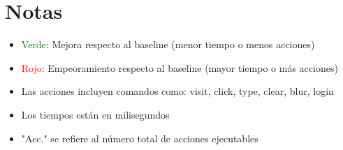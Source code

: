 \documentclass{article}
\begin{document}
\section*{Notas}

\begin{itemize}
\item \textcolor{green}{Verde}: Mejora respecto al baseline (menor tiempo o menos acciones)
\item \textcolor{red}{Rojo}: Empeoramiento respecto al baseline (mayor tiempo o más acciones)
\item Las acciones incluyen comandos como: visit, click, type, clear, blur, login
\item Los tiempos están en milisegundos
\item "Acc." se refiere al número total de acciones ejecutables
\end{itemize}
\end{document}

